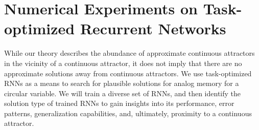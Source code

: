 \documentclass{article} %
\newcommand{\mpcomment}[1]{\textcolor{mpcolor}{(#1)}}
\newcounter{ct}
\theoremstyle{definition}
\theoremstyle{remark}
\begin{document}




\section{Numerical Experiments on Task-optimized Recurrent Networks}\label{sec:experiments}

While our theory describes the abundance of approximate continuous attractors in the vicinity of a continuous attractor, it does not imply that there are no approximate solutions away from continuous attractors.
We use task-optimized RNNs as a means to search for plausible solutions for analog memory for a circular variable.
We will train a diverse set of RNNs, and then identify the solution type of trained RNNs to gain insights into its performance, error patterns, generalization capabilities, and, ultimately, proximity to a continuous attractor.
\end{document}
